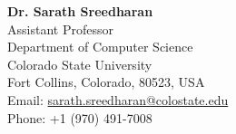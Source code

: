 \documentclass[11pt, a4paper]{article}
\begin{document}
\textbf{\color{cvred}Dr. Sarath Sreedharan} \\
          Assistant Professor \\
          Department of Computer Science \\
          Colorado State University \\
          Fort Collins, Colorado, 80523, USA \\
          Email: \href{mailto:Sarath.Sreedharan@colostate.edu}{sarath.sreedharan@colostate.edu} \\
          Phone: +1 (970) 491-7008 \\
\end{document}
